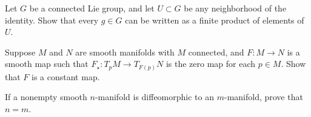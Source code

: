 \documentclass[12pt]{pset}
\begin{document}
\begin{problem}[Lee 2-11]
  Let $G$ be a connected Lie group, and let $U \subset G$ be any
  neighborhood of the identity.  Show that every $g \in G$ can be
  written as a finite product of elements of $U$.
\end{problem}

\begin{problem}[Lee 3--1]
  Suppose $M$ and $N$ are smooth manifolds with $M$ connected, and $F
  : M \to N$ is a smooth map such that $F_\star : T_p M \to T_{F(p)}
  N$ is the zero map for each $p \in M$.  Show that $F$ is a constant
  map.
\end{problem}

\begin{problem}[Lee 3--3]
  If a nonempty smooth $n$-manifold is diffeomorphic to an
  $m$-manifold, prove that $n = m$.
\end{problem}
\end{document}
